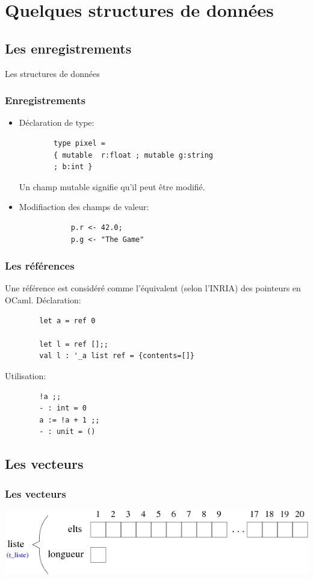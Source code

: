 
\section{Quelques structures de données}
\subsection{Les enregistrements}

\begin{frame}
	\begin{center}
		\huge 
		Les structures de données
	\end{center}
\end{frame}


\begin{frame}[fragile]
	\frametitle{Enregistrements}
	\begin{itemize}
	\item Déclaration de type: 
		\begin{lstlisting}
		type pixel = 
		{ mutable  r:float ; mutable g:string 
		; b:int } 
		\end{lstlisting}
		Un champ mutable signifie qu'il peut être modifié.
	
	\item Modifiaction des champs de valeur:
		\begin{lstlisting}
			p.r <- 42.0;
			p.g <- "The Game"
		\end{lstlisting}
	\end{itemize}
\end{frame}


\begin{frame}[fragile]
	\frametitle{Les références}
	Une référence est considéré comme l'équivalent (selon l'INRIA) des pointeurs en OCaml.
	Déclaration:
	\begin{lstlisting}
		let a = ref 0

		let l = ref [];;
		val l : '_a list ref = {contents=[]}
	\end{lstlisting}
	Utilisation:
	\begin{lstlisting}
		!a ;;
		- : int = 0
		a := !a + 1 ;;
		- : unit = ()
	\end{lstlisting}

\end{frame}

\subsection{Les vecteurs}

\begin{frame}
	\frametitle{Les vecteurs}
	\includegraphics[scale=0.5]{pics/vect.png}
\end{frame}

